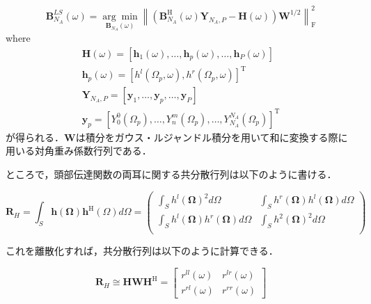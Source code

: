 \documentclass[a4paper]{jsarticle}
\begin{document}
\begin{equation}
    \label{least_square}
    \boldsymbol{B}_{N_{A}}^{L S}(\omega)=\underset{\boldsymbol{B}_{N_{A}}(\omega)}{\arg \min }\left\|\left(\boldsymbol{B}_{N_{A}}^{\mathrm{H}}(\omega) \boldsymbol{Y}_{N_{A}, P}-\boldsymbol{H}(\omega)\right) \boldsymbol{W}^{1 / 2}\right\|_{\mathrm{F}}^{2}
\end{equation}
where
$$
    \begin{array}{l}
        \boldsymbol{H}(\omega)=\left[\boldsymbol{h}_{1}(\omega), \ldots, \boldsymbol{h}_{p}(\omega), \ldots, \boldsymbol{h}_{P}(\omega)\right] \\
        \boldsymbol{h}_{p}(\omega)=\left[h^{l}\left(\Omega_{p}, \omega\right), h^{r}\left(\Omega_{p}, \omega\right)\right]^{\mathrm{T}}        \\
        \boldsymbol{Y}_{N_{A}, P}=\left[\boldsymbol{y}_{1}, \ldots, \boldsymbol{y}_{p}, \ldots, \boldsymbol{y}_{P}\right]                      \\
        \boldsymbol{y}_{p}=\left[Y_{0}^{0}\left(\Omega_{p}\right), \ldots, Y_{n}^{m}\left(\Omega_{p}\right), \ldots, Y_{N_{A}}^{N_{A}}\left(\Omega_{p}\right)\right]^{\mathrm{T}}
    \end{array}
$$
が得られる．$\mathbf{W}$は積分をガウス・ルジャンドル積分を用いて和に変換する際に用いる対角重み係数行列である．

ところで，頭部伝達関数の両耳に関する共分散行列は以下のように書ける．

$$
    \boldsymbol{R}_{H}= \int_{S} \boldsymbol{h}(\boldsymbol{\Omega}) \boldsymbol{h}^{\mathrm{H}}(\Omega) d \Omega = \begin{pmatrix}
        \int_{S} h^l(\boldsymbol{\Omega})^2 d \Omega                       & \int_{S} h^r(\boldsymbol{\Omega}) h^l(\boldsymbol{\Omega})d \Omega \\
        \int_{S} h^l(\boldsymbol{\Omega}) h^r(\boldsymbol{\Omega})d \Omega & \int_{S} h^2(\boldsymbol{\Omega})^2 d \Omega                       \\
    \end{pmatrix}
$$

これを離散化すれば，共分散行列は以下のように計算できる．

$$
    \boldsymbol{R}_{H} \cong \boldsymbol{H} \boldsymbol{W} \boldsymbol{H}^{\mathrm{H}}=\left[\begin{array}{cc}
            r^{l l}(\omega) & r^{l r}(\omega) \\
            r^{r l}(\omega) & r^{r r}(\omega)
        \end{array}\right]
$$
\end{document}
